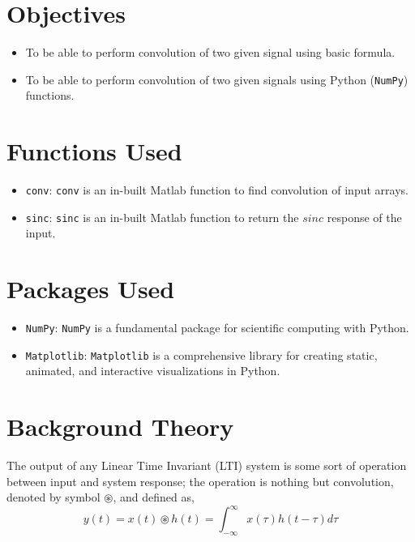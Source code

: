 \documentclass{lab_sheet}
\begin{document}
\clearpage
\tableofcontents
\clearpage
{}
{}
\listoffigures
\clearpage
{}
{}
\lstlistoflistings
\clearpage
{}
\section{Objectives}
\begin{itemize}
    \item To be able to perform convolution of two given signal using basic formula.
    \item To be able to perform convolution of two given signals using Python (\texttt{NumPy}) functions.
\end{itemize}
\section{Functions Used}
\begin{itemize}
    \item \texttt{conv}: \texttt{conv} is an in-built Matlab function to find convolution of input arrays.
    \item \texttt{sinc}: \texttt{sinc} is an in-built Matlab function to return the $sinc$ response of the input. 
\end{itemize}
\section{Packages Used}
\begin{itemize}
    \item \texttt{NumPy}: \texttt{NumPy} is a fundamental package for scientific computing with Python.
    \item \texttt{Matplotlib}: \texttt{Matplotlib} is a comprehensive library for creating static, animated, and interactive visualizations in Python.
\end{itemize}
\section{Background Theory}
The output of any Linear Time Invariant (LTI) system is some sort of operation between input and system response; the operation is nothing but convolution, denoted by symbol $\circledast$, and defined as,
\begin{equation}
    y(t)=x(t)\circledast h(t)=\int_{-\infty}^{\infty}x(\tau)h(t-\tau)d\tau
    \label{eqn:ct_convo}
\end{equation}
\end{document}
